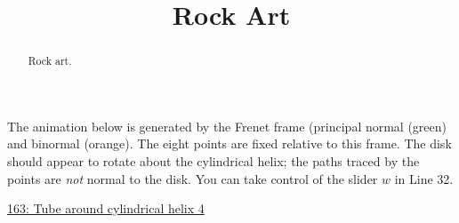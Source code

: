 \documentclass{ximera}
\title{Rock Art}
\begin{document}
\begin{abstract}
Rock art.
\end{abstract}
\maketitle



\begin{exploration}
The animation below is generated by the Frenet frame (principal normal (green) and binormal (orange). The eight points are fixed relative to this frame. The disk should appear to rotate about the cylindrical helix; the paths traced by the points are \emph{not} normal to the disk. You can take control of the slider $w$ in Line 32.

\begin{onlineOnly}
    \begin{center}
\end{center}
\end{onlineOnly}

\href{https://www.desmos.com/3d/vroc5lhox8}{163: Tube around cylindrical helix 4}
\end{exploration}
\end{document}
